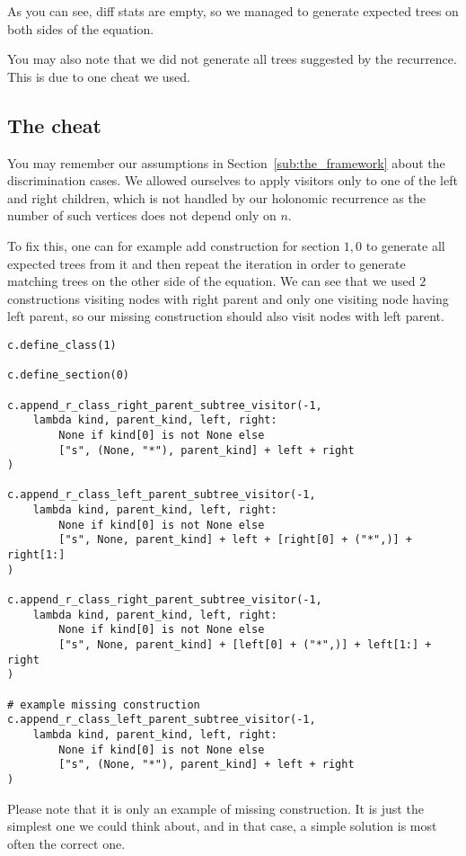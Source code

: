 \documentclass[final]{article}
\theoremstyle{definition}
\theoremstyle{remark}
\begin{document}
As you can see, diff stats are empty, so we managed to generate expected trees on both sides of the equation.

You may also note that we did not generate all trees suggested by the recurrence. This is due to one cheat we used.

\subsection{The cheat}%
\label{sub:the_cheat}

You may remember our assumptions in Section~\ref{sub:the_framework} about the discrimination cases. We allowed ourselves to apply visitors only to one of the left and right children, which is not handled by our holonomic recurrence as the number of such vertices does not depend only on \(n\).

To fix this, one can for example add construction for section \(1, 0\) to generate all expected trees from it and then repeat the iteration in order to generate matching trees on the other side of the equation. We can see that we used \(2\) constructions visiting nodes with right parent and only one visiting node having left parent, so our missing construction should also visit nodes with left parent.

\begin{lstlisting}
c.define_class(1)

c.define_section(0)

c.append_r_class_right_parent_subtree_visitor(-1,
    lambda kind, parent_kind, left, right:
        None if kind[0] is not None else
        ["s", (None, "*"), parent_kind] + left + right
)

c.append_r_class_left_parent_subtree_visitor(-1,
    lambda kind, parent_kind, left, right:
        None if kind[0] is not None else
        ["s", None, parent_kind] + left + [right[0] + ("*",)] + right[1:]
)

c.append_r_class_right_parent_subtree_visitor(-1,
    lambda kind, parent_kind, left, right:
        None if kind[0] is not None else
        ["s", None, parent_kind] + [left[0] + ("*",)] + left[1:] + right
)

# example missing construction
c.append_r_class_left_parent_subtree_visitor(-1,
    lambda kind, parent_kind, left, right:
        None if kind[0] is not None else
        ["s", (None, "*"), parent_kind] + left + right
)
\end{lstlisting}

Please note that it is only an example of missing construction. It is just the simplest one we could think about, and in that case, a simple solution is most often the correct one.
\end{document}
